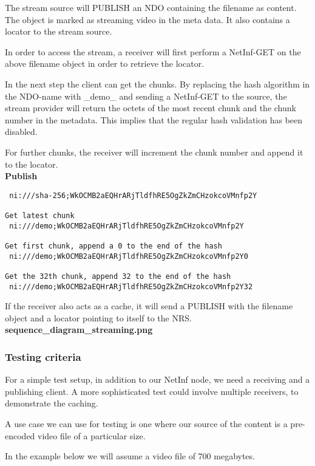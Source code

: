 \documentclass[11pt]{report}
\begin{document}
The stream source will PUBLISH an NDO containing the filename as content. The object is marked as streaming video in the meta data. It also contains a locator to the stream source.

In order to access the stream, a receiver will first perform a NetInf-GET on the above filename object in order to retrieve the locator. 

In the next step the client can get the chunks. By replacing the hash algorithm in the NDO-name with \_demo\_ and sending a NetInf-GET to the source, the stream provider will return the octets of the most recent chunk and the chunk number in the metadata. This implies that the regular hash validation has been disabled.

For further chunks, the receiver will increment the chunk number and append it to the locator.\\

\textbf{Publish}\\
\begin{verbatim}
 ni:///sha-256;WkOCMB2aEQHrARjTldfhRE5OgZkZmCHzokcoVMnfp2Y

Get latest chunk
 ni:///demo;WkOCMB2aEQHrARjTldfhRE5OgZkZmCHzokcoVMnfp2Y

Get first chunk, append a 0 to the end of the hash
 ni:///demo;WkOCMB2aEQHrARjTldfhRE5OgZkZmCHzokcoVMnfp2Y0

Get the 32th chunk, append 32 to the end of the hash
 ni:///demo;WkOCMB2aEQHrARjTldfhRE5OgZkZmCHzokcoVMnfp2Y32
\end{verbatim}
 
If the receiver also acts as a cache, it will send a PUBLISH with the filename object and a locator pointing to itself to the NRS.
\\

\textbf{sequence\_diagram\_streaming.png}

\subsubsection{Testing criteria} 

For a simple test setup, in addition to our NetInf node, we need a receiving and a publishing client. A more sophisticated test could involve multiple receivers, to demonstrate the caching.

A use case we can use for testing is one where our source of the content is a pre-encoded video file of a particular size.

In the example below we will assume a video file of 700 megabytes.
\end{document}
